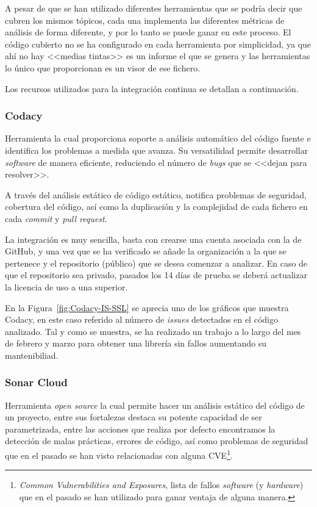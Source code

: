 A pesar de que se han utilizado diferentes herramientas que se podría decir que cubren los mismos tópicos, cada una implementa las diferentes métricas de análisis de forma diferente, y por lo tanto se puede ganar en este proceso. El código cubierto no se ha configurado en cada herramienta por simplicidad, ya que ahí no hay <<medias tintas>> es un informe el que se genera y las herramientas lo único que proporcionan es un visor de ese fichero.

Los recursos utilizados para la integración continua se detallan a continuación.

\subsubsection{Codacy}
Herramienta la cual proporciona soporte a análisis automático del código fuente e identifica los problemas a medida que avanza. Su versatilidad permite desarrollar \textit{software} de manera eficiente, reduciendo el número de \textit{bugs} que se <<dejan para resolver>>. 

A través del análisis estático de código estático, notifica problemas de seguridad, cobertura del código, así como la duplicación y la complejidad de cada fichero en cada \textit{commit} y \textit{pull request}.

La integración es muy sencilla, basta con crearse una cuenta asociada con la de GitHub, y una vez que se ha verificado se añade la organización a la que se pertenece y el repositorio (público) que se desea comenzar a analizar. En caso de que el repositorio sea privado, pasados los 14 días de prueba se deberá actualizar la licencia de uso a una superior.


En la Figura~\ref{fig:Codacy-IS-SSL} se aprecia uno de los gráficos que muestra Codacy, en este caso referido al número de \textit{issues} detectados en el código analizado. Tal y como se muestra, se ha realizado un trabajo a lo largo del mes de febrero y marzo para obtener una librería sin fallos aumentando su mantenibiliad.

\subsubsection{Sonar Cloud}

Herramienta \textit{open source} la cual permite hacer un análisis estático del código de un proyecto, entre sus fortalezas destaca su potente capacidad de ser parametrizada, entre las acciones que realiza por defecto encontramos la detección de malas prácticas, errores de código, así como problemas de seguridad que en el pasado se han visto relacionadas con alguna CVE\footnote{\textit{Common Vulnerabilities and Exposures}, lista de fallos \textit{software} (y \textit{hardware}) que en el pasado se han utilizado para ganar ventaja de alguna manera.}.

